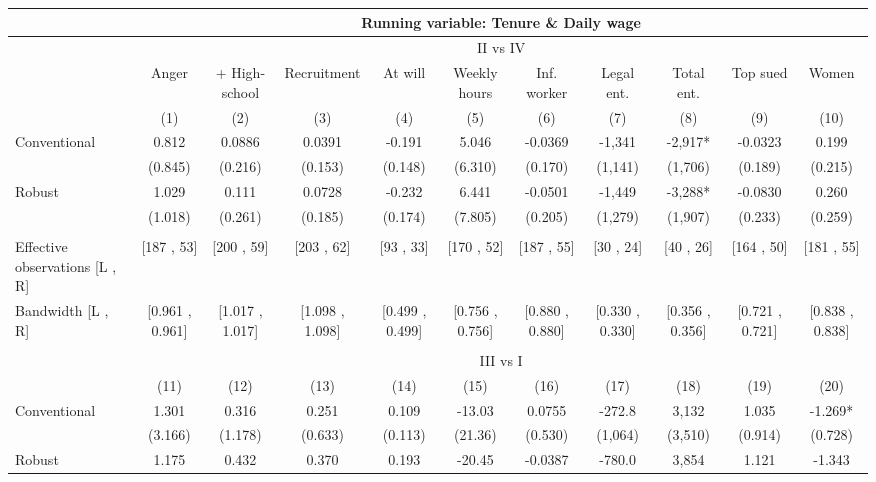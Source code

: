 \begin{tabular}{lcccccccccc}
\toprule
      & \multicolumn{10}{c}{Running variable: Tenure \& Daily wage} \\
\midrule
      & \multicolumn{10}{c}{II vs IV} \\
\midrule
\midrule
      & Anger & + High-school & Recruitment & At will  & Weekly hours & Inf. worker & Legal ent. & Total ent. & Top sued & Women \\
\midrule
      & (1)   & (2)   & (3)   & (4)   & (5)   & (6)   & (7)   & (8)   & (9)   & (10) \\
\midrule
\midrule
Conventional & 0.812 & 0.0886 & 0.0391 & -0.191 & 5.046 & -0.0369 & -1,341 & -2,917* & -0.0323 & 0.199 \\
      & (0.845) & (0.216) & (0.153) & (0.148) & (6.310) & (0.170) & (1,141) & (1,706) & (0.189) & (0.215) \\
Robust & 1.029 & 0.111 & 0.0728 & -0.232 & 6.441 & -0.0501 & -1,449 & -3,288* & -0.0830 & 0.260 \\
      & (1.018) & (0.261) & (0.185) & (0.174) & (7.805) & (0.205) & (1,279) & (1,907) & (0.233) & (0.259) \\
      &       &       &       &       &       &       &       &       &       &  \\
\midrule
Effective observations [L , R] & [187 , 53] & [200 , 59] & [203 , 62] & [93 , 33] & [170 , 52] & [187 , 55] & [30 , 24] & [40 , 26] & [164 , 50] & [181 , 55] \\
Bandwidth [L , R] & [0.961 , 0.961] & [1.017 , 1.017] & [1.098 , 1.098] & [0.499 , 0.499] & [0.756 , 0.756] & [0.880 , 0.880] & [0.330 , 0.330] & [0.356 , 0.356] & [0.721 , 0.721] & [0.838 , 0.838] \\
\midrule
\midrule
      &       &       &       &       &       &       &       &       &       &  \\
\midrule
      & \multicolumn{10}{c}{III vs I} \\
\midrule
\midrule
      & (11)  & (12)  & (13)  & (14)  & (15)  & (16)  & (17)  & (18)  & (19)  & (20) \\
\midrule
\midrule
Conventional & 1.301 & 0.316 & 0.251 & 0.109 & -13.03 & 0.0755 & -272.8 & 3,132 & 1.035 & -1.269* \\
      & (3.166) & (1.178) & (0.633) & (0.113) & (21.36) & (0.530) & (1,064) & (3,510) & (0.914) & (0.728) \\
Robust & 1.175 & 0.432 & 0.370 & 0.193 & -20.45 & -0.0387 & -780.0 & 3,854 & 1.121 & -1.343 \\

\end{tabular}
